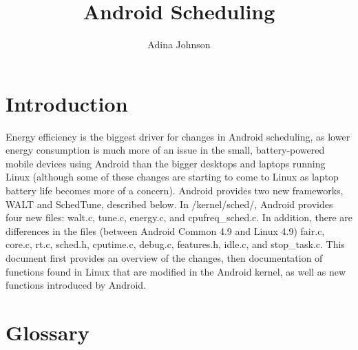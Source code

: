 \documentclass{article}
\title{Android Scheduling}
\author{Adina Johnson}
\date{}
\begin{document}
\maketitle

\section{Introduction}

Energy efficiency is the biggest driver for changes in Android scheduling, as lower energy consumption is much more of an issue in the small, battery-powered mobile devices using Android than the bigger desktops and laptops running Linux (although some of these changes are starting to come to Linux as laptop battery life becomes more of a concern). Android provides two new frameworks, WALT and SchedTune, described below. In /kernel/sched/, Android provides four new files: walt.c, tune.c, energy.c, and cpufreq\_sched.c. In addition, there are differences in the files (between Android Common 4.9 and Linux 4.9) fair.c, core.c, rt.c, sched.h, cputime.c, debug.c, features.h, idle.c, and stop\_task.c. This document first provides an overview of the changes, then documentation of functions found in Linux that are modified in the Android kernel, as well as new functions introduced by Android.

\section{Glossary}
\end{document}
